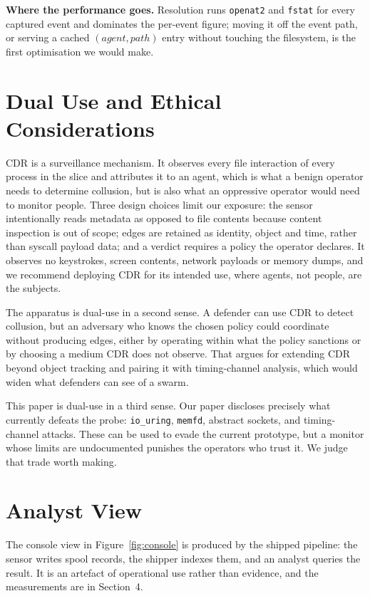 \documentclass[11pt]{article}
\begin{document}
\textbf{Where the performance goes.} Resolution runs \texttt{openat2} and
\texttt{fstat} for every captured event and dominates the per-event figure; moving it
off the event path, or serving a cached $(\mathit{agent},\mathit{path})$ entry without
touching the filesystem, is the first optimisation we would make.

\section{Dual Use and Ethical Considerations}

CDR is a surveillance mechanism. It observes every file interaction of every process in
the slice and attributes it to an agent, which is what a benign operator needs to
determine collusion, but is also what an oppressive operator would need to monitor
people. Three design choices limit our exposure: the sensor intentionally reads
metadata as opposed to file contents because content inspection is out of scope; edges
are retained as identity, object and time, rather than syscall payload data; and a
verdict requires a policy the operator declares. It observes no keystrokes, screen
contents, network payloads or memory dumps, and we recommend deploying CDR for its
intended use, where agents, not people, are the subjects.

The apparatus is dual-use in a second sense. A defender can use CDR to detect
collusion, but an adversary who knows the chosen policy could coordinate without
producing edges, either by operating within what the policy sanctions or by choosing a
medium CDR does not observe. That argues for extending CDR beyond object tracking and
pairing it with timing-channel analysis, which would widen what defenders can see of a
swarm.

This paper is dual-use in a third sense. Our paper discloses precisely what currently
defeats the probe: \texttt{io\_uring}, \texttt{memfd}, abstract sockets, and
timing-channel attacks. These can be used to evade the current prototype, but a monitor
whose limits are undocumented punishes the operators who trust it. We judge that trade
worth making.

\onecolumn
\section{Analyst View}

The console view in Figure~\ref{fig:console} is produced by the shipped pipeline: the
sensor writes spool records, the shipper indexes them, and an analyst queries the
result. It is an artefact of operational use rather than evidence, and the
measurements are in Section~4.
\end{document}
